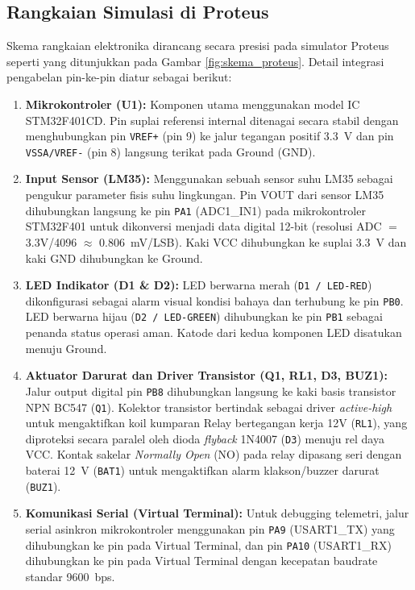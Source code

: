 \documentclass[11pt,a4paper]{article}
\begin{document}
\begin{longtable}
\subsection{Rangkaian Simulasi di Proteus}
\hspace{1.5em}Skema rangkaian elektronika dirancang secara presisi pada simulator Proteus seperti yang ditunjukkan pada Gambar \ref{fig:skema_proteus}. Detail integrasi pengabelan pin-ke-pin diatur sebagai berikut:
\begin{enumerate}
    \item \textbf{Mikrokontroler (U1):} Komponen utama menggunakan model IC STM32F401CD. Pin suplai referensi internal ditenagai secara stabil dengan menghubungkan pin \texttt{VREF+} (pin 9) ke jalur tegangan positif 3.3~V dan pin \texttt{VSSA/VREF-} (pin 8) langsung terikat pada Ground (GND).
    \item \textbf{Input Sensor (LM35):} Menggunakan sebuah sensor suhu LM35 sebagai pengukur parameter fisis suhu lingkungan. Pin VOUT dari sensor LM35 dihubungkan langsung ke pin \texttt{PA1} (ADC1\_IN1) pada mikrokontroler STM32F401 untuk dikonversi menjadi data digital 12-bit (resolusi ADC $=$ 3.3V/4096 $\approx$ 0.806~mV/LSB). Kaki VCC dihubungkan ke suplai 3.3~V dan kaki GND dihubungkan ke Ground.
    \item \textbf{LED Indikator (D1 \& D2):} LED berwarna merah (\texttt{D1 / LED-RED}) dikonfigurasi sebagai alarm visual kondisi bahaya dan terhubung ke pin \texttt{PB0}. LED berwarna hijau (\texttt{D2 / LED-GREEN}) dihubungkan ke pin \texttt{PB1} sebagai penanda status operasi aman. Katode dari kedua komponen LED disatukan menuju Ground.
    \item \textbf{Aktuator Darurat dan Driver Transistor (Q1, RL1, D3, BUZ1):} Jalur output digital pin \texttt{PB8} dihubungkan langsung ke kaki basis transistor NPN BC547 (\texttt{Q1}). Kolektor transistor bertindak sebagai driver \textit{active-high} untuk mengaktifkan koil kumparan Relay bertegangan kerja 12V (\texttt{RL1}), yang diproteksi secara paralel oleh dioda \textit{flyback} 1N4007 (\texttt{D3}) menuju rel daya VCC. Kontak sakelar \textit{Normally Open} (NO) pada relay dipasang seri dengan baterai 12~V (\texttt{BAT1}) untuk mengaktifkan alarm klakson/buzzer darurat (\texttt{BUZ1}).
    \item \textbf{Komunikasi Serial (Virtual Terminal):} Untuk debugging telemetri, jalur serial asinkron mikrokontroler menggunakan pin \texttt{PA9} (USART1\_TX) yang dihubungkan ke pin  pada Virtual Terminal, dan pin \texttt{PA10} (USART1\_RX) dihubungkan ke pin  pada Virtual Terminal dengan kecepatan baudrate standar 9600~bps.
\end{enumerate}


\end{longtable}
\end{document}
